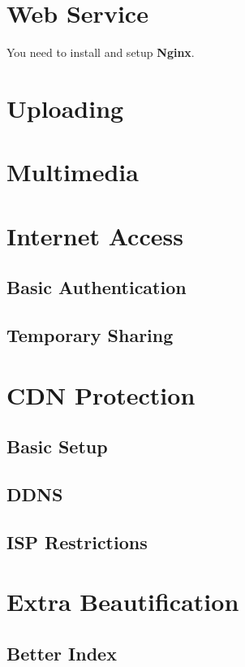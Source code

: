 \section{Web Service}

You need to install and setup \textbf{Nginx}.

\section{Uploading}
\section{Multimedia}
\section{Internet Access}
\subsection{Basic Authentication}
\subsection{Temporary Sharing}
\section{CDN Protection}
\subsection{Basic Setup}
\subsection{DDNS}
\subsection{ISP Restrictions}
\section{Extra Beautification}
\subsection{Better Index}
